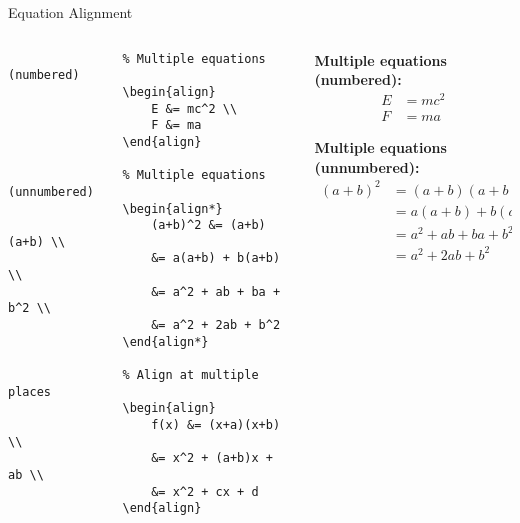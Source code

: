 \begin{frame}[fragile]{Equation Alignment}
    \begin{columns}
        \begin{column}{0.5\textwidth}
            \begin{lstlisting}
                % Multiple equations (numbered)
                \begin{align}
                    E &= mc^2 \\
                    F &= ma
                \end{align}
                
                % Multiple equations (unnumbered)
                \begin{align*}
                    (a+b)^2 &= (a+b)(a+b) \\
                    &= a(a+b) + b(a+b) \\
                    &= a^2 + ab + ba + b^2 \\
                    &= a^2 + 2ab + b^2
                \end{align*}
                
                % Align at multiple places
                \begin{align}
                    f(x) &= (x+a)(x+b) \\
                    &= x^2 + (a+b)x + ab \\
                    &= x^2 + cx + d
                \end{align}
            \end{lstlisting}
        \end{column}
        
        \begin{column}{0.5\textwidth}
            \textbf{Multiple equations (numbered):}
            \begin{align}
                E &= mc^2 \\
                F &= ma
            \end{align}
            
            \textbf{Multiple equations (unnumbered):}
            \begin{align*}
                (a+b)^2 &= (a+b)(a+b) \\
                &= a(a+b) + b(a+b) \\
                &= a^2 + ab + ba + b^2 \\
                &= a^2 + 2ab + b^2
            \end{align*}
            

\end{column}
\end{columns}
\end{frame}
